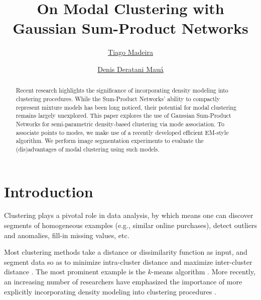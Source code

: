\documentclass[accepted]{tpm2023} %
\title{On Modal Clustering with Gaussian Sum-Product Networks}
\author[1]{\href{mailto:madeira@ime.usp.br}{Tiago Madeira}{}}
\author[1]{\href{mailto:ddm@ime.usp.br}{Denis Deratani Mauá}{}}
\affil[1]{%
 Institute of Mathematics and Statistics\\
 University of São Paulo\\
 Brazil
}
\begin{document}
\maketitle

\begin{abstract}
  Recent research highlights the significance of incorporating density modeling into clustering procedures.
  While the Sum-Product Networks' ability to compactly represent mixture models has been long noticed, their potential for modal clustering remains largely unexplored.
  This paper explores the use of Gaussian Sum-Product Networks for semi-parametric density-based clustering via mode association.
  To associate points to modes, we make use of a recently developed efficient EM-style algorithm.
  We perform image segmentation experiments to evaluate the (dis)advantages of modal clustering using such models.
\end{abstract}

\section{Introduction}
\label{sec:intro}

Clustering plays a pivotal role in data analysis, by which means one can discover segments of homogeneous examples (e.g., similar online purchases), detect outliers and anomalies, fill-in missing values, etc.

Most clustering methods take a distance or dissimilarity function as input, and segment data so as to minimize intra-cluster distance and maximize inter-cluster distance \citep{clustering}.
The most prominent example is the $k$-means algorithm \citep{MacQueen1967}.
%
%
More recently, an increasing number of researchers have emphasized the importance of more explicitly incorporating density modeling into clustering procedures \citep{Carlsson2013}.
%
\end{document}
